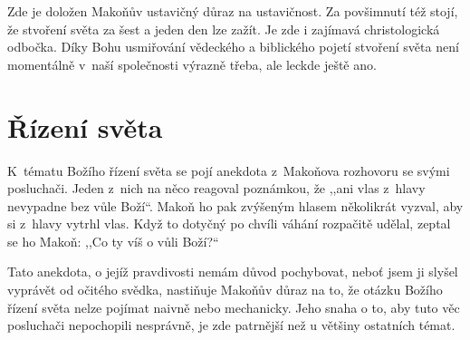 \begin{enumerate}
{Zde je doložen Makoňův ustavičný důraz na ustavičnost. Za povšimnutí též stojí,
že stvoření světa za šest a jeden den lze zažít. Je zde i zajímavá
christologická odbočka. Díky Bohu usmiřování vědeckého a biblického pojetí
stvoření světa není momentálně v~naší společnosti výrazně třeba, ale leckde
ještě ano.

}

\end{enumerate}

\section{Řízení světa}

K~tématu Božího řízení světa se pojí anekdota z~Makoňova rozhovoru se svými
posluchači. Jeden z~nich na něco reagoval poznámkou, že ,,ani vlas z~hlavy
nevypadne bez vůle Boží``. Makoň ho pak zvýšeným hlasem několikrát vyzval, aby si
z~hlavy vytrhl vlas. Když to dotyčný po chvíli váhání rozpačitě udělal, zeptal
se ho Makoň: ,,Co ty víš o vůli Boží?``

Tato anekdota, o jejíž pravdivosti nemám důvod pochybovat, neboť jsem ji slyšel
vyprávět od očitého svědka, nastiňuje Makoňův důraz na to, že otázku Božího
řízení světa nelze pojímat naivně nebo mechanicky. Jeho snaha o to, aby tuto věc
posluchači nepochopili nesprávně, je zde patrnější než u většiny ostatních
témat.

